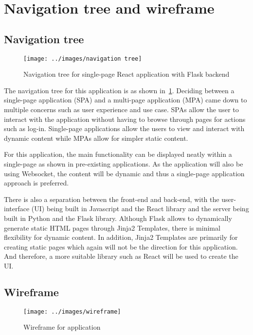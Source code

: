 \clearpage


\section{Navigation tree and wireframe}\label{sec:navigation-tree-and-wireframe}

\subsection{Navigation tree}\label{subsec:navigation-tree}

\begin{figure}[h]
    \centering
    \texttt{[image: ../images/navigation tree]}
    \caption{Navigation tree for single-page React application with Flask backend}
    \label{fig:navigationTree}
\end{figure}
The navigation tree for this application is as shown in~\ref{fig:navigationTree}.
Deciding between a single-page application (SPA) and a multi-page application (MPA) came down to multiple concerns such as user experience and use case.
SPAs allow the user to interact with the application without having to browse through pages for actions such as log-in.
Single-page applications allow the users to view and interact with dynamic content while MPAs allow for simpler static content.

For this application, the main functionality can be displayed neatly within a single-page as shown in pre-existing applications.
As the application will also be using Websocket, the content will be dynamic and thus a single-page application approach is preferred.

There is also a separation between the front-end and back-end, with the user-interface (UI) being built in Javascript and the React library and the server being built in Python and the Flask library.
Although Flask allows to dynamically generate static HTML pages through Jinja2 Templates, there is minimal flexibility for dynamic content.
In addition, Jinja2 Templates are primarily for creating static pages which again will not be the direction for this application.
And therefore, a more suitable library such as React will be used to create the UI.

\subsection{Wireframe}\label{subsec:wireframe}

\begin{figure}[H]
    \centering
    \texttt{[image: ../images/wireframe]}
    \caption{Wireframe for application}
    \label{fig:wireframe}
\end{figure}

